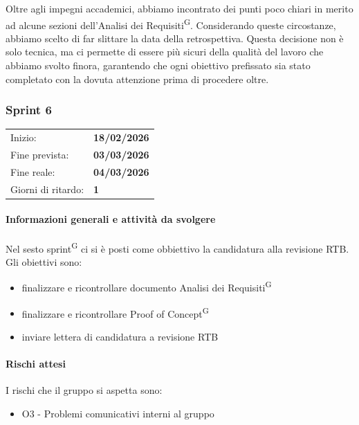 \documentclass[a4paper, 11pt]{article}
\newcommand{\subsubsubsection}[1]{\paragraph{#1}}
\begin{document}
Oltre agli impegni accademici, abbiamo incontrato dei punti poco chiari in merito ad alcune sezioni dell'Analisi dei Requisiti\textsuperscript{G}.
Considerando queste circostanze, abbiamo scelto di far slittare la data della retrospettiva. Questa decisione non è solo tecnica, ma ci permette di essere più sicuri della qualità del lavoro che abbiamo svolto finora, garantendo che ogni obiettivo prefissato sia stato completato con la dovuta attenzione prima di procedere oltre.\\







\newpage







\subsubsection{Sprint 6}
\begin{tabular}{ll}
	Inizio: & \textbf{18/02/2026} \\
	Fine prevista: & \textbf{03/03/2026} \\
	Fine reale: & \textbf{04/03/2026} \\
	Giorni di ritardo: & \textbf{1} \\
\end{tabular}


\subsubsubsection{Informazioni generali e attività da svolgere}
Nel sesto sprint\textsuperscript{G} ci si è posti come obbiettivo la candidatura alla revisione RTB.\\
Gli obiettivi sono:
\begin{itemize}
	\item finalizzare e ricontrollare documento Analisi dei Requisiti\textsuperscript{G}
	\item finalizzare e ricontrollare Proof of Concept\textsuperscript{G}
	\item inviare lettera di candidatura a revisione RTB
\end{itemize}

\subsubsubsection{Rischi attesi}
I rischi che il gruppo si aspetta sono:
\begin{itemize}
	\item O3 - Problemi comunicativi interni al gruppo
\end{itemize}
\end{document}
